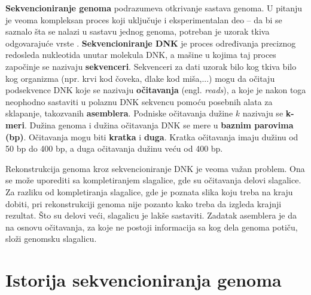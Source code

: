 \documentclass[12pt,oneside]{memoir}
\begin{document}
\textbf{Sekvencioniranje genoma} podrazumeva otkrivanje sastava genoma. U pitanju je veoma kompleksan proces koji uključuje i eksperimentalan deo – da bi se saznalo šta se nalazi u sastavu jednog genoma, potreban je uzorak tkiva
odgovarajuće vrste \cite{skriptaBio}. \textbf{Sekvencioniranje DNK} je proces određivanja preciznog redosleda nukleotida unutar molekula DNK, a mašine u kojima taj proces započinje se nazivaju \textbf{sekvenceri}. Sekvenceri za dati uzorak bilo kog tkiva bilo kog organizma (npr. krvi kod čoveka, dlake kod miša,...) mogu da očitaju podsekvence DNK koje se nazivaju \textbf{očitavanja} (engl. \textit{reads}), a koje je nakon toga neophodno sastaviti u polaznu DNK sekvencu pomoću posebnih alata za sklapanje, takozvanih \textbf{asemblera}. Podniske očitavanja dužine $k$ nazivaju se \textbf{k-meri}. Dužina genoma i dužina očitavanja DNK se mere u \textbf{baznim parovima (bp)}. Očitavanja mogu biti  \textbf{kratka} i \textbf{duga}. Kratka očitavanja imaju dužinu od 50 bp do 400 bp, a duga očitavanja dužinu veću od 400 bp.

Rekonstrukcija genoma kroz sekvencioniranje DNK je veoma važan problem. Ona se može uporediti sa kompletiranjem slagalice, gde su očitavanja delovi slagalice. Za razliku od kompletiranja slagalice, gde je poznata slika koju treba na kraju dobiti, pri rekonstrukciji genoma nije pozanto kako treba da izgleda krajnji rezultat. Što su delovi veći, slagalicu je lakše sastaviti. Zadatak asemblera je da na osnovu očitavanja, za koje ne postoji informacija sa kog dela genoma potiču, složi genomsku slagalicu.

\begin{comment}
Rekonstrukcija genoma kroz sekvencioniranje DNK je veoma važan problem u genomici. Postojeće biotehnologije ne mogu proći kroz ceo hromozom, jer je predugačak. Umesto toga, genom se rekonstruiše indirektno. Prvo, vrši se razbijanje genoma na DNK fragmente koristeći pristup očitavanja celog sekvencioniranog genoma (engl. \textit{whole genome shotgun approach}). Zatim se pomoću mašine za sekvencioniranje na osnovu fragmenata vrši dekodiranje DNK sekvence. Ove DNK sekvence se nazivaju \textbf{očitavanja (engl. \textit{reads})}. Usled slučajnog uzorkovanja , ekstahovana očitavanja pokrivaju ceo genom ravnomerno. Lepljenjem ovih očitavanja možemo računski rekonstruisati genom. Ovaj proces je poznat kao \textbf{genomsko sekvencioniranje \textit{de novo}}.
\end{comment}

\section{Istorija sekvencioniranja genoma}
\end{document}
